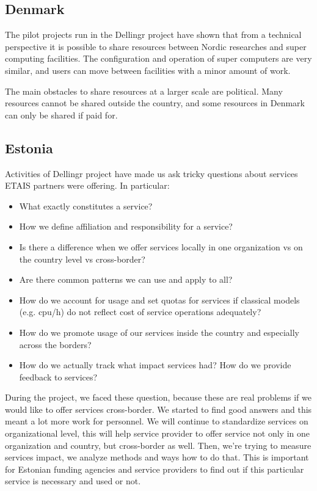 \documentclass{article}
\newcommand{\dell}{Dellingr\xspace}
\begin{document}
\subsection{Denmark}

The pilot projects run in the \dell project have shown that from a technical perspective it is possible to share resources between Nordic researches and super computing facilities. 
The configuration and operation of super computers are very similar, and users can move between facilities with a minor amount of work.

The main obstacles to share resources at a larger scale are political. Many resources cannot be shared outside the country, and some resources in Denmark can only be shared if paid for. 

\subsection{Estonia}

Activities of \dell project have made us ask tricky questions about services ETAIS partners were offering. In particular:
\begin{itemize}
\item What exactly constitutes a service? 
\item How we define affiliation and responsibility for a service?
\item Is there a difference when we offer services locally in one organization vs on the country level vs cross-border?
\item Are there common patterns we can use and apply to all?
\item How do we account for usage and set quotas for services if classical models (e.g. cpu/h) do not reflect cost of service operations adequately?
\item How do we promote usage of our services inside the country and especially across the borders?
\item How do we actually track what impact services had? How do we provide feedback to services?
\end{itemize}

During the project, we faced these question, because these are real problems if we would like to offer services cross-border. 
We started to find good answers and this meant a lot more work for personnel. We will continue to standardize services on organizational level, this will help service provider to offer service not only in one organization and country, but cross-border as well. 
Then, we're trying to measure services impact, we analyze methods and ways how to do that. 
This is important for Estonian funding agencies and service providers to find out if this particular service is necessary and used or not. 
\end{document}
